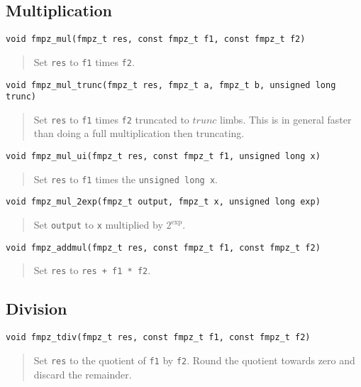 \documentclass[a4paper,10pt]{article}
\newcommand{\code}{\lstinline}
\begin{document}
\subsection{Multiplication}

\begin{lstlisting}
void fmpz_mul(fmpz_t res, const fmpz_t f1, const fmpz_t f2)
\end{lstlisting}
\begin{quote}
Set \code{res} to \code{f1} times \code{f2}.
\end{quote}

\begin{lstlisting}
void fmpz_mul_trunc(fmpz_t res, fmpz_t a, fmpz_t b, unsigned long trunc) 
\end{lstlisting}
\begin{quote}
Set \code{res} to \code{f1} times \code{f2} truncated to $trunc$ limbs. This is in general faster than doing a full multiplication then truncating.
\end{quote}

\begin{lstlisting}
void fmpz_mul_ui(fmpz_t res, const fmpz_t f1, unsigned long x)
\end{lstlisting}
\begin{quote}
Set \code{res} to \code{f1} times the \code{unsigned long x}.
\end{quote}

\begin{lstlisting}
void fmpz_mul_2exp(fmpz_t output, fmpz_t x, unsigned long exp)
\end{lstlisting}
\begin{quote}
Set \code{output} to \code{x} multiplied by $2^{\mbox{exp}}$.
\end{quote}

\begin{lstlisting}
void fmpz_addmul(fmpz_t res, const fmpz_t f1, const fmpz_t f2)
\end{lstlisting}
\begin{quote}
Set \code{res} to \code{res + f1 * f2}.
\end{quote}

\subsection{Division}

\begin{lstlisting}
void fmpz_tdiv(fmpz_t res, const fmpz_t f1, const fmpz_t f2)
\end{lstlisting}
\begin{quote}
Set \code{res} to the quotient of \code{f1} by \code{f2}. Round the quotient towards zero and discard the remainder.
\end{quote}
\end{document}
